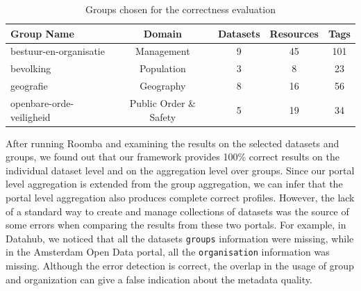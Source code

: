 \documentclass[runningheads,a4paper]{../../Util/LaTEX/llncs}
\begin{document}
\begin{table}[ht]
\centering
\begin{tabular}{|l|c|c|c|c|}
\hline
\textbf{Group Name}      & \textbf{Domain}        & \multicolumn{1}{l|}{\textbf{Datasets}} & \multicolumn{1}{l|}{\textbf{Resources}} & \multicolumn{1}{l|}{\textbf{Tags}} \\ \hline
bestuur-en-organisatie   & Management             & 9                                      & 45                                      & 101                                \\ \hline
bevolking                & Population             & 3                                      & 8                                       & 23                                 \\ \hline
geografie                & Geography              & 8                                      & 16                                      & 56                                 \\ \hline
openbare-orde-veiligheid & Public Order \& Safety & 5                                      & 19                                      & 34                                 \\ \hline
\end{tabular}
\caption{Groups chosen for the correctness evaluation}
\label{tab:groups_experiment}
\end{table}

After running Roomba and examining the results on the selected datasets and groups, we found out that our framework provides 100\% correct results on the individual dataset level and on the aggregation level over groups. Since our portal level aggregation is extended from the group aggregation, we can infer that the portal level aggregation also produces complete correct profiles. However, the lack of a standard way to create and manage collections of datasets was the source of some errors when comparing the results from these two portals. For example, in Datahub, we noticed that all the datasets \texttt{groups} information were missing, while in the Amsterdam Open Data portal, all the \texttt{organisation} information was missing. Although the error detection is correct, the overlap in the usage of group and organization can give a false indication about the metadata quality.
\end{document}
